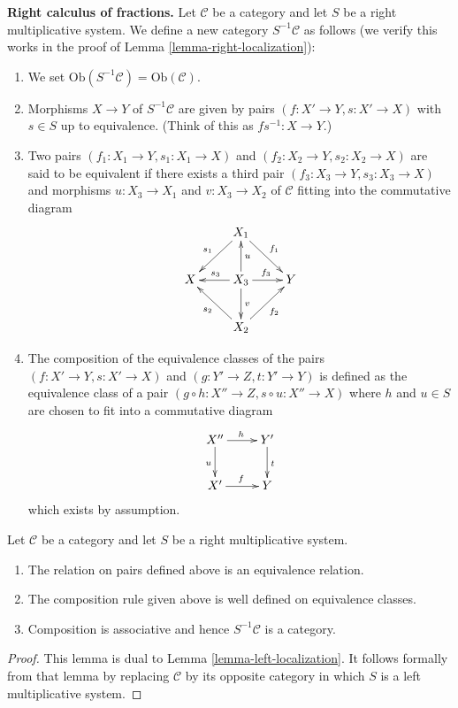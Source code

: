 \noindent
{\bf Right calculus of fractions.}
Let $\mathcal{C}$ be a category and let $S$ be a right multiplicative
system. We define a new category $S^{-1}\mathcal{C}$ as follows
(we verify this works in the proof of
Lemma \ref{lemma-right-localization}):
\begin{enumerate}
\item We set $\text{Ob}(S^{-1}\mathcal{C}) = \text{Ob}(\mathcal{C})$.
\item Morphisms $X \to Y$ of $S^{-1}\mathcal{C}$ are given by pairs
$(f : X' \to Y, s : X' \to X)$ with $s \in S$ up to equivalence.
(Think of this as $fs^{-1} : X \to Y$.)
\item Two pairs $(f_1 : X_1 \to Y, s_1 : X_1 \to X)$ and
$(f_2 : X_2 \to Y, s_2 : X_2 \to X)$ are said to be equivalent
if there exists a third pair $(f_3 : X_3 \to Y, s_3 : X_3 \to X)$
and morphisms $u : X_3 \to X_1$ and $v : X_3 \to X_2$ of $\mathcal{C}$
fitting into the commutative diagram
$$
\xymatrix{
 & X_1 \ar[ld]_{s_1} \ar[rd]^{f_1} & \\
X &
X_3 \ar[l]_{s_3} \ar[u]_u \ar[d]^v \ar[r]^{f_3} &
Y \\
& X_2 \ar[lu]^{s_2} \ar[ru]_{f_2} &
}
$$
\item The composition of the equivalence classes of the pairs
$(f : X' \to Y, s : X' \to X)$ and $(g : Y' \to Z, t : Y' \to Y)$
is defined as the equivalence class of a pair
$(g \circ h : X'' \to Z, s \circ u : X'' \to X)$
where $h$ and $u \in S$ are chosen to fit into a commutative diagram
$$
\xymatrix{
X'' \ar[d]_u \ar[r]^h & Y' \ar[d]^t \\
X' \ar[r]^f & Y
}
$$
which exists by assumption.
\end{enumerate}

\begin{lemma}
\label{lemma-right-localization}
Let $\mathcal{C}$ be a category and let $S$ be a right multiplicative
system.
\begin{enumerate}
\item The relation on pairs defined above is an equivalence relation.
\item The composition rule given above is well defined on equivalence
classes.
\item Composition is associative and hence $S^{-1}\mathcal{C}$
is a category.
\end{enumerate}
\end{lemma}

\begin{proof}
This lemma is dual to
Lemma \ref{lemma-left-localization}.
It follows formally from that lemma by replacing
$\mathcal{C}$ by its opposite category in which
$S$ is a left multiplicative system.
\end{proof}

